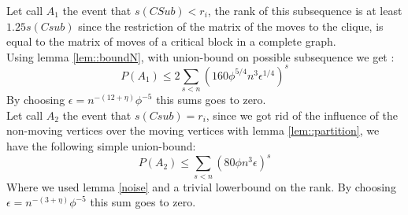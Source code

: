 Let call $A_1$ the event that $s(CSub) < r_i$, the rank of this subsequence is at least $1.25 s(Csub)$ since the restriction of the matrix of the moves to the clique, is equal to the matrix of moves of a critical block in a complete graph.\\
Using lemma \ref{lem::boundN}, with union-bound on possible subsequence we get :
\begin{equation*}
P(A_1) \leq 2 \sum_{s < n}(160\phi^{5/4}n^3\epsilon^{1/4})^s
\end{equation*}
By choosing $\epsilon = n^{-(12 + \eta)}\phi^{-5}$ this sums goes to zero.\\

Let call $A_2$ the event that $s(Csub) = r_i$, since we got rid of the influence of the non-moving vertices over the moving vertices with lemma \ref{lem::partition}, we have the following simple union-bound:
\begin{equation*}
P(A_2) \leq \sum_{s < n}(80\phi n^3 \epsilon)^s
\end{equation*}
Where we used lemma \ref{noise} and a trivial lowerbound on the rank.
By choosing $\epsilon = n^{-(3 + \eta)}\phi^{-5}$ this sum goes to zero. 

